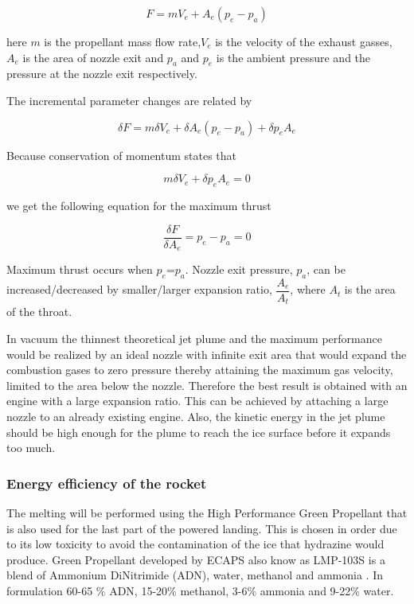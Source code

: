 \begin{equation}
F=mV_e+A_e(p_e-p_a)
\end{equation}

here $m$ is the propellant mass flow rate,$V_e$ is the velocity of the exhaust gasses, $A_e$ is the area of nozzle exit and $p_a$ and $p_e$ is the ambient pressure and the pressure at the nozzle exit respectively. 

The incremental parameter changes are related by

\begin{equation}
\delta F=m\delta V_e +\delta A_e(p_e-p_a) +\delta p_e A_e
\end{equation}

Because conservation of momentum states that 

\begin{equation}
m\delta V_e+\delta p_e A_e=0
\end{equation}

we get the following equation for the maximum thrust

\begin{equation}
\dfrac{\delta F}{\delta A_e}=p_e-p_a=0 
\end{equation}

Maximum thrust occurs when $p_e$=$p_a$. Nozzle exit pressure, $p_a$, can be increased/decreased by smaller/larger expansion ratio, $\dfrac{A_e}{A_t}$, where $A_t$ is the area of the throat. 

In vacuum the thinnest theoretical jet plume and the maximum performance would be realized by an ideal nozzle with infinite exit area that would expand the combustion gases to zero pressure thereby attaining the maximum gas velocity, limited to the area below the nozzle. Therefore the best result is obtained with an engine with a large expansion ratio. This can be achieved by attaching a large nozzle to an already existing engine. Also, the kinetic energy in the jet plume should be high enough for the plume to reach the ice surface before it expands too much. 


\subsubsection{Energy efficiency of the rocket}

The melting will be performed using the High Performance Green Propellant that is also used for the last part of the powered landing. This is chosen in order due to its low toxicity to avoid the contamination of the ice that hydrazine would produce. Green Propellant developed by ECAPS also know as LMP-103S is a blend of Ammonium DiNitrimide (ADN), water, methanol and ammonia \cite{Walter_2014}. In formulation 60-65 \% ADN, 15-20\% methanol, 3-6\% ammonia and 9-22\% water. \cite{Taylor_2013}

